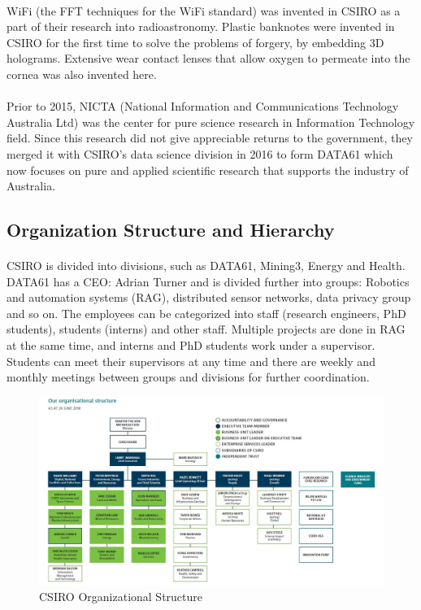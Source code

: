 \paragraph{}
WiFi (the FFT techniques for the WiFi standard) was invented in CSIRO as a part of their research into radioastronomy. Plastic banknotes were invented in CSIRO for the first time to solve the problems of forgery, by embedding 3D holograms. Extensive wear contact lenses that allow oxygen to permeate into the cornea was also invented here. 

\paragraph{}
Prior to 2015, NICTA (National Information and Communications Technology Australia Ltd) was the center for pure science research in Information Technology field. Since this research did not give appreciable returns to the government, they merged it with CSIRO's data science division in 2016 to form DATA61 which now focuses on pure and applied scientific research that supports the industry of Australia.

\subsection{Organization Structure and Hierarchy}

\paragraph{}
CSIRO is divided into divisions, such as DATA61, Mining3, Energy and Health. DATA61 has a CEO: Adrian Turner and is divided further into groups: Robotics and automation systems (RAG), distributed sensor networks, data privacy group and so on. The employees can be categorized into staff (research engineers, PhD students), students (interns) and other staff. Multiple projects are done in RAG at the same time, and interns and PhD students work under a supervisor. Students can meet their supervisors at any time and there are weekly and monthly meetings between groups and divisions for further coordination.

\begin{figure}[h]
    \centering
    \includegraphics[width=16cm]{figures/csiro_struct.jpg}
    \caption{CSIRO Organizational Structure}\vspace{-4mm}
\end{figure}

